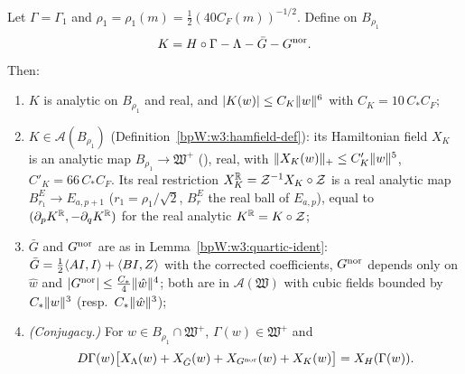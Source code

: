 \begin{theorem}[Analytic partial Birkhoff normal form; P96-W Main Proposition for $J=\{1,2\}$]\label{bpW:w3:main}
Let $\Gamma=\Gamma_1$ and $\rho_1=\rho_1(m)=\frac12(40C_F(m))^{-1/2}$. Define on $B_{\rho_1}$
\[K=H\circ\Gamma-\Lambda-\bar G-G^{\rm nor}.\]
Then:
\begin{enumerate}[label=(\roman*)]
\item $K$ is analytic on $B_{\rho_1}$ and real, and $\lvert K(w)\rvert\le C_K\lVert w\rVert^6$ with $C_K=10\,C_*C_F$;
\item $K\in\mathcal A(B_{\rho_1})$ (Definition~\ref{bpW:w3:hamfield-def}): its Hamiltonian field $X_K$ is an
  analytic map $B_{\rho_1}\to\mathfrak W^+$ (), real, with
  $\lVert X_K(w)\rVert_+\le C'_K\lVert w\rVert^5$, $C'_K=66\,C_*C_F$. Its real restriction
  $X_K^{\mathbb{R}}=\mathcal Z^{-1}X_K\circ\mathcal Z$ is a real analytic map $B^E_{r_1}\to E_{a,p+1}$
  ($r_1=\rho_1/\sqrt2$, $B^E_r$ the real ball of $E_{a,p}$), equal to $(\partial_pK^{\mathbb{R}},-\partial_qK^{\mathbb{R}})$ for the real
  analytic $K^{\mathbb{R}}=K\circ\mathcal Z$;
\item $\bar G$ and $G^{\rm nor}$ are as in Lemma~\ref{bpW:w3:quartic-ident}: $\bar G=\frac12\langle AI,I\rangle+\langle BI,Z\rangle$
  with the corrected coefficients, $G^{\rm nor}$ depends only on $\hat w$ and $\lvert G^{\rm nor}\rvert\le\frac{C_*}4\lVert \hat w\rVert^4$;
  both are in $\mathcal A(\mathfrak W)$ with cubic fields bounded by $C_*\lVert w\rVert^3$ (resp.\ $C_*\lVert \hat w\rVert^3$);
\item \emph{(Conjugacy.)} For $w\in B_{\rho_1}\cap\mathfrak W^+$, $\Gamma(w)\in\mathfrak W^+$ and
  \[D\Gamma(w)\bigl[X_\Lambda(w)+X_{\bar G}(w)+X_{G^{\rm nor}}(w)+X_K(w)\bigr]=X_H(\Gamma(w)).\]
\end{enumerate}
\end{theorem}

